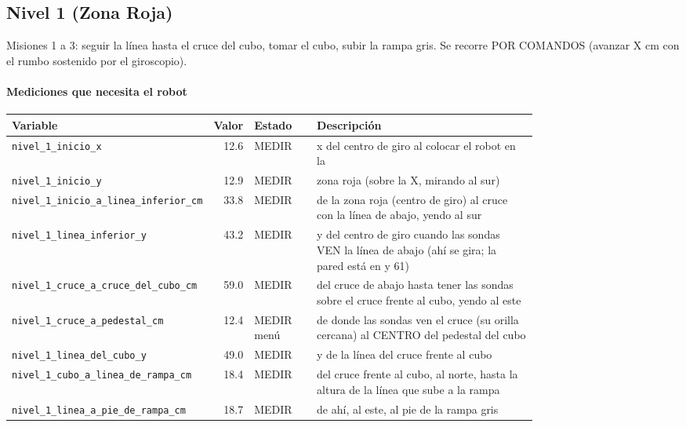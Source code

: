 \subsection{Nivel 1 (Zona Roja)}
Misiones 1 a 3: seguir la línea hasta el cruce del cubo, tomar el cubo, subir la rampa gris. Se recorre POR COMANDOS (avanzar X cm con el rumbo sostenido por el giroscopio).

\paragraph{Mediciones que necesita el robot}
\begin{longtable}{@{}p{0.36\linewidth}rlp{0.42\linewidth}@{}}\toprule
\textbf{Variable} & \textbf{Valor} & \textbf{Estado} & \textbf{Descripci\'on} \\\midrule\endhead
\texttt{nivel\_\allowbreak{}1\_\allowbreak{}inicio\_\allowbreak{}x} & 12.6 & MEDIR & x del centro de giro al colocar el robot en la \\
\texttt{nivel\_\allowbreak{}1\_\allowbreak{}inicio\_\allowbreak{}y} & 12.9 & MEDIR & zona roja (sobre la X, mirando al sur) \\
\texttt{nivel\_\allowbreak{}1\_\allowbreak{}inicio\_\allowbreak{}a\_\allowbreak{}linea\_\allowbreak{}inferior\_\allowbreak{}cm} & 33.8 & MEDIR & de la zona roja (centro de giro) al cruce con la línea de abajo, yendo al sur \\
\texttt{nivel\_\allowbreak{}1\_\allowbreak{}linea\_\allowbreak{}inferior\_\allowbreak{}y} & 43.2 & MEDIR & y del centro de giro cuando las sondas VEN la línea de abajo (ahí se gira; la pared está en y 61) \\
\texttt{nivel\_\allowbreak{}1\_\allowbreak{}cruce\_\allowbreak{}a\_\allowbreak{}cruce\_\allowbreak{}del\_\allowbreak{}cubo\_\allowbreak{}cm} & 59.0 & MEDIR & del cruce de abajo hasta tener las sondas sobre el cruce frente al cubo, yendo al este \\
\texttt{nivel\_\allowbreak{}1\_\allowbreak{}cruce\_\allowbreak{}a\_\allowbreak{}pedestal\_\allowbreak{}cm} & 12.4 & MEDIR menú & de donde las sondas ven el cruce (su orilla cercana) al CENTRO del pedestal del cubo \\
\texttt{nivel\_\allowbreak{}1\_\allowbreak{}linea\_\allowbreak{}del\_\allowbreak{}cubo\_\allowbreak{}y} & 49.0 & MEDIR & y de la línea del cruce frente al cubo \\
\texttt{nivel\_\allowbreak{}1\_\allowbreak{}cubo\_\allowbreak{}a\_\allowbreak{}linea\_\allowbreak{}de\_\allowbreak{}rampa\_\allowbreak{}cm} & 18.4 & MEDIR & del cruce frente al cubo, al norte, hasta la altura de la línea que sube a la rampa \\
\texttt{nivel\_\allowbreak{}1\_\allowbreak{}linea\_\allowbreak{}a\_\allowbreak{}pie\_\allowbreak{}de\_\allowbreak{}rampa\_\allowbreak{}cm} & 18.7 & MEDIR & de ahí, al este, al pie de la rampa gris \\
\bottomrule\end{longtable}
